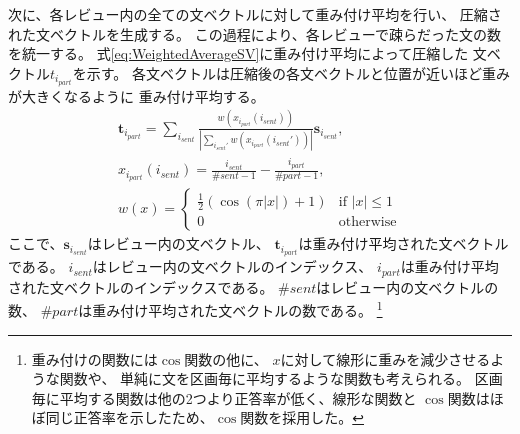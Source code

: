 次に、各レビュー内の全ての文ベクトルに対して重み付け平均を行い、
圧縮された文ベクトルを生成する。
この過程により、各レビューで疎らだった文の数を統一する。
式\ref{eq:WeightedAverageSV}に重み付け平均によって圧縮した
文ベクトル$t_{i_{part}}$を示す。
各文ベクトルは圧縮後の各文ベクトルと位置が近いほど重みが大きくなるように
重み付け平均する。
\begin{gather}
  \mathbf{t}_{i_{part}} = \sum_{i_{sent}}
                          \frac{w(x_{i_{part}}(i_{sent}))}
                               {|\sum_{i_{sent}'}
                                w(x_{i_{part}}(i_{sent}'))|}
                          \mathbf{s}_{i_{sent}},
  \label{eq:WeightedAverageSV} \\
  x_{i_{part}}(i_{sent}) = \frac{i_{sent}}{\#sent - 1}
                           - \frac{i_{part}}{\#part - 1}, \nonumber \\
  w(x) = \begin{cases}
    \frac{1}{2} (\cos(\pi|x|) + 1) & \text{if $|x| \leq 1$} \\
    0 & \text{otherwise}
  \end{cases} \nonumber
\end{gather}
ここで、$\mathbf{s}_{i_{sent}}$はレビュー内の文ベクトル、
$\mathbf{t}_{i_{part}}$は重み付け平均された文ベクトルである。
$i_{sent}$はレビュー内の文ベクトルのインデックス、
$i_{part}$は重み付け平均された文ベクトルのインデックスである。
$\#sent$はレビュー内の文ベクトルの数、
$\#part$は重み付け平均された文ベクトルの数である。
\footnote{
  重み付けの関数には$\cos$関数の他に、
  $x$に対して線形に重みを減少させるような関数や、
  単純に文を区画毎に平均するような関数も考えられる。
  区画毎に平均する関数は他の2つより正答率が低く、線形な関数と
  $\cos$関数はほぼ同じ正答率を示したため、$\cos$関数を採用した。
}

